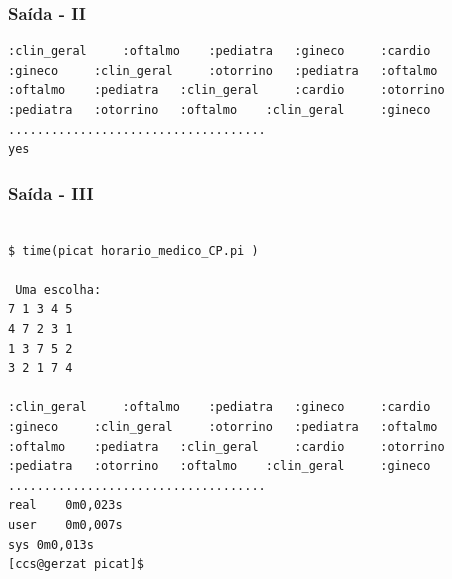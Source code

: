 \documentclass{beamer}
\begin{document}

\begin{frame}[fragile]

\frametitle{Saída - II}

\begin{footnotesize}
\begin{verbatim}
:clin_geral 	:oftalmo 	:pediatra 	:gineco 	:cardio 	
:gineco 	:clin_geral 	:otorrino 	:pediatra 	:oftalmo 	
:oftalmo 	:pediatra 	:clin_geral 	:cardio 	:otorrino 	
:pediatra 	:otorrino 	:oftalmo 	:clin_geral 	:gineco 	
....................................
yes
\end{verbatim}
  
\end{footnotesize}
\end{frame}

\begin{frame}[fragile]

\frametitle{Saída - III}

\begin{footnotesize}
\begin{verbatim}

$ time(picat horario_medico_CP.pi )

 Uma escolha:
7 1 3 4 5 
4 7 2 3 1 
1 3 7 5 2 
3 2 1 7 4 

:clin_geral 	:oftalmo 	:pediatra 	:gineco 	:cardio 	
:gineco 	:clin_geral 	:otorrino 	:pediatra 	:oftalmo 	
:oftalmo 	:pediatra 	:clin_geral 	:cardio 	:otorrino 	
:pediatra 	:otorrino 	:oftalmo 	:clin_geral 	:gineco 	
....................................
real	0m0,023s
user	0m0,007s
sys	0m0,013s
[ccs@gerzat picat]$ 
\end{verbatim}
  
\end{footnotesize}
\end{frame}





\end{document}

